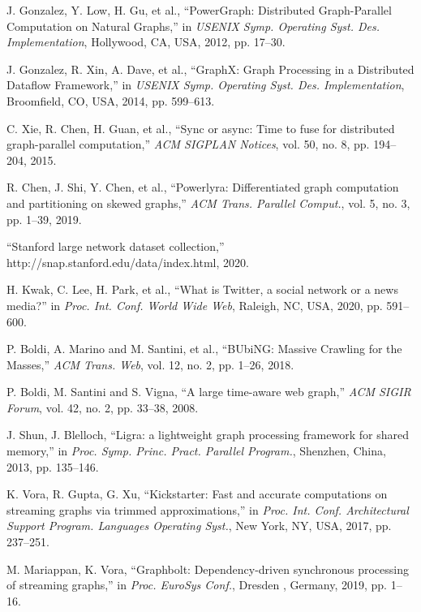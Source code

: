 \documentclass[lettersize,journal]{IEEEtran} %
\begin{document}
\begin{thebibliography}{100}
  J. Gonzalez, Y. Low, H. Gu, et al., ``{PowerGraph}: Distributed {Graph-Parallel} Computation on Natural Graphs,'' in \textit{USENIX Symp. Operating Syst. Des. Implementation}, Hollywood, CA, USA, 2012, pp. 17--30.
  
  J. Gonzalez, R. Xin, A. Dave, et al., ``{GraphX}: Graph Processing in a Distributed Dataflow Framework,'' in \textit{USENIX Symp. Operating Syst. Des. Implementation}, Broomfield, CO, USA, 2014, pp. 599--613.
  
  C. Xie, R. Chen, H. Guan, et al., ``Sync or async: Time to fuse for distributed graph-parallel computation,'' \textit{ACM SIGPLAN Notices}, vol. 50, no. 8, pp. 194--204, 2015.
  
  R. Chen, J. Shi, Y. Chen, et al., ``Powerlyra: Differentiated graph computation and partitioning on skewed graphs,'' \textit{ACM Trans. Parallel Comput.}, vol. 5, no. 3, pp. 1--39, 2019.
  
  ``Stanford large network dataset collection,'' http://snap.stanford.edu/data/index.html, 2020.
  
  H. Kwak, C. Lee, H. Park, et al., ``What is Twitter, a social network or a news media?'' in \textit{Proc. Int. Conf. World Wide Web}, Raleigh, NC, USA, 2020, pp. 591--600.
  
  P. Boldi, A. Marino and M. Santini, et al.,  ``BUbiNG: Massive Crawling for the Masses,''  \textit{ACM Trans. Web}, vol. 12, no. 2, pp. 1--26, 2018.
  
  P. Boldi, M. Santini and S. Vigna,  ``A large time-aware web graph,''  \textit{ACM SIGIR Forum}, vol. 42, no. 2, pp. 33--38, 2008.
  
  J. Shun, J. Blelloch, ``Ligra: a lightweight graph processing framework for shared memory,'' in \textit{Proc. Symp. Princ. Pract. Parallel Program.}, Shenzhen, China, 2013, pp. 135--146.
  
  K. Vora, R. Gupta, G. Xu, ``Kickstarter: Fast and accurate computations on streaming graphs via trimmed approximations,'' in \textit{Proc. Int. Conf. Architectural Support Program. Languages Operating Syst.}, New York, NY, USA, 2017, pp. 237--251.
  
  M. Mariappan, K. Vora, ``Graphbolt: Dependency-driven synchronous processing of streaming graphs,'' in \textit{Proc. EuroSys Conf.}, Dresden , Germany, 2019, pp. 1--16.
  

\end{thebibliography}
\end{document}
